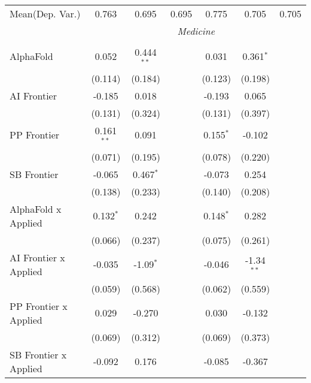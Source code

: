 \begin{tabular}{lcccccc}
Mean(Dep. Var.) & 0.763 & 0.695 & 0.695 & 0.775 & 0.705 & 0.705 \\
 & \multicolumn{6}{c}{\textit{Medicine}} \\ \\
   AlphaFold                      & 0.052        & 0.444$^{**}$ &               & 0.031       & 0.361$^{*}$  &   \\   
                                  & (0.114)      & (0.184)      &               & (0.123)     & (0.198)      &   \\   
   AI Frontier                    & -0.185       & 0.018        &               & -0.193      & 0.065        &   \\   
                                  & (0.131)      & (0.324)      &               & (0.131)     & (0.397)      &   \\   
   PP Frontier                    & 0.161$^{**}$ & 0.091        &               & 0.155$^{*}$ & -0.102       &   \\   
                                  & (0.071)      & (0.195)      &               & (0.078)     & (0.220)      &   \\   
   SB Frontier                    & -0.065       & 0.467$^{*}$  &               & -0.073      & 0.254        &   \\   
                                  & (0.138)      & (0.233)      &               & (0.140)     & (0.208)      &   \\   
   AlphaFold x Applied            & 0.132$^{*}$  & 0.242        &               & 0.148$^{*}$ & 0.282        &   \\   
                                  & (0.066)      & (0.237)      &               & (0.075)     & (0.261)      &   \\   
   AI Frontier x Applied          & -0.035       & -1.09$^{*}$  &               & -0.046      & -1.34$^{**}$ &   \\   
                                  & (0.059)      & (0.568)      &               & (0.062)     & (0.559)      &   \\   
   PP Frontier x Applied          & 0.029        & -0.270       &               & 0.030       & -0.132       &   \\   
                                  & (0.069)      & (0.312)      &               & (0.069)     & (0.373)      &   \\   
   SB Frontier x Applied          & -0.092       & 0.176        &               & -0.085      & -0.367       &   \\   

\end{tabular}
